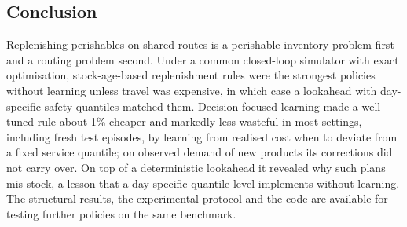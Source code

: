 \subsection{Conclusion}

Replenishing perishables on shared routes is a perishable inventory problem first and a routing problem second. Under a common closed-loop simulator with exact optimisation, stock-age-based replenishment rules were the strongest policies without learning unless travel was expensive, in which case a lookahead with day-specific safety quantiles matched them. Decision-focused learning made a well-tuned rule about 1\% cheaper and markedly less wasteful in most settings, including fresh test episodes, by learning from realised cost when to deviate from a fixed service quantile; on observed demand of new products its corrections did not carry over. On top of a deterministic lookahead it revealed why such plans mis-stock, a lesson that a day-specific quantile level implements without learning. The structural results, the experimental protocol and the code are available for testing further policies on the same benchmark.
